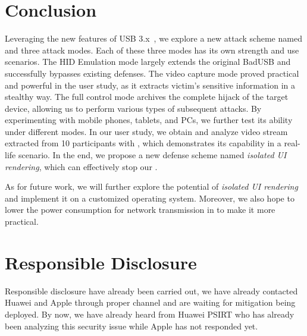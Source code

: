 \section{Conclusion}
\label{sec:conclusion}

Leveraging the new features of \ac{USB} 3.x~\cite{usb30,usb31,usb32}, we explore a
new attack scheme named \tool and three attack modes. Each of these three modes
has its own strength and use scenarios. The \ac{HID} Emulation mode largely extends the
original BadUSB and successfully bypasses existing defenses. The video capture mode proved practical and powerful in the user study, as it extracts
victim's sensitive information in a stealthy way. The full control mode
archives the complete hijack of the target device, allowing us to perform various
types of subsequent attacks. By experimenting \tool with mobile phones, tablets,
and PCs, we further test its ability under different modes. In our user study, we
obtain and analyze video stream extracted from 10 participants with \tool,
which demonstrates its capability in a real-life scenario. In the end, we
propose a new defense scheme named \textit{isolated UI rendering}, which can
effectively stop our \tool.

As for future work, we will further explore the potential of \textit{isolated UI
rendering} and implement it on a customized operating system. Moreover, we also
hope to lower the power consumption for network transmission in \tool to make
it more practical.

\section{Responsible Disclosure}

Responsible disclosure have already been carried out, we have already contacted Huawei and Apple through proper channel and are waiting for mitigation being deployed. By now, we have already heard from Huawei PSIRT who has already been analyzing this security issue while Apple has not responded yet. 